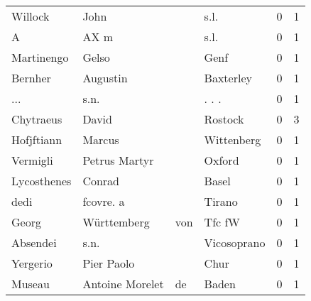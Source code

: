 \begin{tabular}{llllrr}
                  Willock &                               John &             &                                        s.l. &          0 &         1 \\
                        A &                               AX m &             &                                        s.l. &          0 &         1 \\
               Martinengo &                              Gelso &             &                                        Genf &          0 &         1 \\
                  Bernher &                           Augustin &             &                                   Baxterley &          0 &         1 \\
                      ... &                               s.n. &             &                                      . . .  &          0 &         1 \\
                Chytraeus &                              David &             &                                     Rostock &          0 &         3 \\
               Hofjftiann &                             Marcus &             &                                  Wittenberg &          0 &         1 \\
                 Vermigli &                      Petrus Martyr &             &                                      Oxford &          0 &         1 \\
              Lycosthenes &                             Conrad &             &                                       Basel &          0 &         1 \\
                     dedi &                          fcovre. a &             &                                      Tirano &          0 &         1 \\
                    Georg &                        Württemberg &         von &                                      Tfc fW &          0 &         1 \\
                 Absendei &                               s.n. &             &                                 Vicosoprano &          0 &         1 \\
                 Yergerio &                         Pier Paolo &             &                                        Chur &          0 &         1 \\
                   Museau &                    Antoine Morelet &          de &                                       Baden &          0 &         1 \\

\end{tabular}
